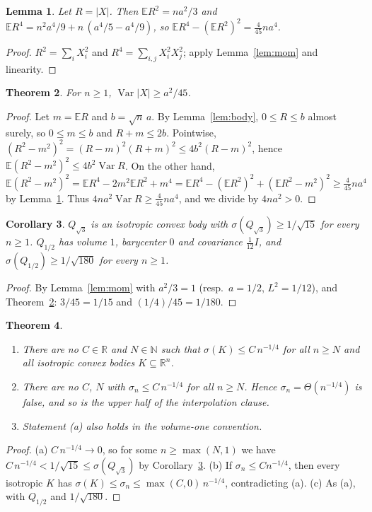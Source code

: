 \documentclass[11pt]{article}
\newtheorem{theorem}{Theorem}
\newtheorem{lemma}[theorem]{Lemma}
\newtheorem{corollary}[theorem]{Corollary}
\theoremstyle{definition}
\theoremstyle{remark}
\begin{document}
\begin{lemma}\label{lem:R}
Let $R=|X|$. Then $\mathbb E R^2=na^2/3$ and
$\mathbb E R^4=n^2a^4/9+n\,(a^4/5-a^4/9)$, so
$\mathbb E R^4-(\mathbb E R^2)^2=\tfrac{4}{45}na^4$.
\end{lemma}
\begin{proof}
$R^2=\sum_iX_i^2$ and $R^4=\sum_{i,j}X_i^2X_j^2$; apply Lemma~\ref{lem:mom} and linearity.
\end{proof}

\begin{theorem}\label{thm:var}
For $n\ge1$, $\operatorname{Var}|X|\ge a^2/45$.
\end{theorem}
\begin{proof}
Let $m=\mathbb E R$ and $b=\sqrt n\,a$. By Lemma~\ref{lem:body}, $0\le R\le b$ almost surely,
so $0\le m\le b$ and $R+m\le 2b$. Pointwise,
$(R^2-m^2)^2=(R-m)^2(R+m)^2\le4b^2(R-m)^2$, hence
$\mathbb E(R^2-m^2)^2\le4b^2\operatorname{Var}R$. On the other hand,
$\mathbb E(R^2-m^2)^2=\mathbb ER^4-2m^2\mathbb ER^2+m^4
=\mathbb ER^4-(\mathbb ER^2)^2+(\mathbb ER^2-m^2)^2\ge\tfrac4{45}na^4$ by Lemma~\ref{lem:R}.
Thus $4na^2\operatorname{Var}R\ge\tfrac4{45}na^4$, and we divide by $4na^2>0$.
\end{proof}

\begin{corollary}\label{cor:iso}
$Q_{\sqrt3}$ is an isotropic convex body with $\sigma(Q_{\sqrt3})\ge1/\sqrt{15}$ for every
$n\ge1$. $Q_{1/2}$ has volume $1$, barycenter $0$ and covariance $\tfrac1{12}I$, and
$\sigma(Q_{1/2})\ge1/\sqrt{180}$ for every $n\ge1$.
\end{corollary}
\begin{proof}
By Lemma~\ref{lem:mom} with $a^2/3=1$ (resp.\ $a=1/2$, $L^2=1/12$), and Theorem~\ref{thm:var}:
$3/45=1/15$ and $(1/4)/45=1/180$.
\end{proof}

\begin{theorem}\label{thm:main}
\begin{enumerate}
\item[(a)] There are no $C\in\mathbb R$ and $N\in\mathbb N$ such that
$\sigma(K)\le C\,n^{-1/4}$ for all $n\ge N$ and all isotropic convex bodies $K\subseteq\mathbb R^n$.
\item[(b)] There are no $C$, $N$ with $\sigma_n\le C\,n^{-1/4}$ for all $n\ge N$. Hence
$\sigma_n=\Theta(n^{-1/4})$ is false, and so is the upper half of the interpolation clause.
\item[(c)] Statement (a) also holds in the volume-one convention.
\end{enumerate}
\end{theorem}
\begin{proof}
(a) $C\,n^{-1/4}\to0$, so for some $n\ge\max(N,1)$ we have $C\,n^{-1/4}<1/\sqrt{15}\le
\sigma(Q_{\sqrt3})$ by Corollary~\ref{cor:iso}. (b) If $\sigma_n\le Cn^{-1/4}$, then every
isotropic $K$ has $\sigma(K)\le\sigma_n\le\max(C,0)\,n^{-1/4}$, contradicting (a). (c) As (a), with
$Q_{1/2}$ and $1/\sqrt{180}$.
\end{proof}
\end{document}
